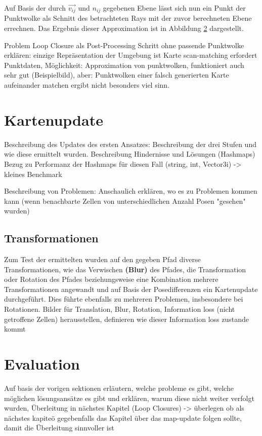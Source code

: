 Auf Basis der durch $\vec{v_{ij}}$ und $n_{ij}$ gegebenen Ebene lässt sich nun ein Punkt der Punktwolke als Schnitt des betrachteten Rays mit der zuvor berechneten Ebene errechnen. Das Ergebnis dieser Approximation ist in Abbildung \ref{} dargestellt.

Problem Loop Closure als Post-Processing Schritt ohne passende Punktwolke erklären:
einzige Repräsentation der Umgebung ist Karte
scan-matching erfordert Punktdaten, Möglichkeit: Approximation von punktwolken, funktioniert auch sehr gut (Beispielbild), aber: Punktwolken einer falsch generierten Karte aufeinander matchen ergibt nicht besonders viel sinn.

\section{Kartenupdate}

Beschreibung des Updates des ersten Ansatzes:
Beschreibung der drei Stufen und wie diese ermittelt wurden.
Beschreibung Hindernisse und Lösungen (Hashmaps)
Bezug zu Performanz der Hashmaps für diesen Fall (string, int, Vector3i)
-> kleines Benchmark

Beschreibung von Problemen:
Anschaulich erklären, wo es zu Problemen kommen kann (wenn benachbarte Zellen von unterschiedlichen Anzahl Posen "gesehen" wurden)

\subsection{Transformationen}




Zum Test der ermittelten wurden auf den gegeben Pfad diverse Transformationen, wie das Verwischen \textbf{(Blur)} des Pfades, die Transformation oder Rotation des Pfades beziehungsweise eine Kombination mehrere Transformationen angewandt und auf Basis der Posedifferenzen ein Kartenupdate durchgeführt. Dies führte ebenfalls zu mehreren Problemen, insbesondere bei Rotationen.
Bilder für Translation, Blur, Rotation, Information loss (nicht getroffene Zellen) herausstellen, definieren wie dieser Information loss zustande kommt

\section{Evaluation}

Auf basis der vorigen sektionen erläutern, welche probleme es gibt, welche möglichen lösungsansätze es gibt und erklären, warum diese nicht weiter verfolgt wurden,
Überleitung in nächstes Kapitel (Loop Closures)
-> überlegen ob als nächstes kapiteö gegebenfalls das Kapitel über das map-update folgen sollte, damit die Überleitung sinnvoller ist



